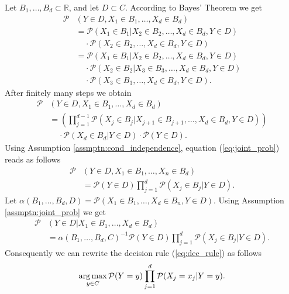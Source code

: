 Let $B_{1}, \ldots, B_{d}\subset\mathbb{R}$, and let $D\subset C$. According to Bayes' Theorem  we get
\begin{align*}
  \mathcal{P}&(Y\in D, X_{1}\in B_{1}, \ldots, X_{d}\in B_{d}) \\
		&= \mathcal{P}(X_{1}\in B_{1}|X_{2}\in B_{2}, \ldots, X_{d}\in B_{d}, Y\in D) \\ 
					& ~~~~~ \cdot	\mathcal{P}(X_{2}\in B_{2}, \ldots, X_{d}\in B_{d}, Y\in D) \\
		&= \mathcal{P}(X_{1}\in B_{1}|X_{2}\in B_{2}, \ldots, X_{d}\in B_{d}, Y\in D) \\
					& ~~~~~ \cdot \mathcal{P}(X_{2}\in B_{2}|X_{3}\in B_{3}, \ldots, X_{d}\in B_{d}, Y\in D) \\
					& ~~~~~ \cdot \mathcal{P}(X_{3}\in B_{3}, \ldots, X_{d}\in B_{d}, Y\in D).
\end{align*}
After finitely many steps we obtain
\begin{align}\label{eq:joint_prob}
  \mathcal{P}&(Y\in D, X_{1}\in B_{1}, \ldots, X_{d}\in B_{d}) \nonumber\\
		&=(\prod_{j = 1}^{d - 1}\mathcal{P}(X_{j}\in B_{j}|X_{j + 1}\in B_{j + 1}, \ldots, X_{d}\in B_{d}, Y\in D)) \nonumber\\
		& ~~~~~	\cdot\mathcal{P}(X_{d}\in B_{d}|Y\in D)\cdot\mathcal{P}(Y\in D).
\end{align}
Using Assumption \ref{assmptn:cond_independence}, equation (\ref{eq:joint_prob}) reads as follows
\begin{align*}
	\mathcal{P}&(Y\in D, X_{1}\in B_{1}, \ldots, X_{n}\in B_{d}) \\
		&= \mathcal{P}(Y\in D)\prod_{j = 1}^{d}\mathcal{P}(X_{j}\in B_{j}|Y\in D).
\end{align*}
Let $\alpha(B_{1}, \ldots, B_{d}, D)=\mathcal{P}(X_{1}\in B_{1}, \ldots, X_{d}\in B_{n}, Y\in D)$. Using Assumption \ref{assmptn:joint_prob} we get
	\begin{align*}
		\mathcal{P}&(Y\in D|X_{1}\in B_{1}, \ldots, X_{d}\in B_{d}) \\
			&= \alpha(B_{1}, \ldots, B_{d}, C)^{-1}\mathcal{P}(Y\in D)\prod_{j = 1}^{d}\mathcal{P}(X_{j}\in B_{j}|Y\in D).
	\end{align*}
Consequently we can rewrite the decision rule (\ref{eq:dec_rule}) as follows
\begin{align}\label{eq:dec_rule_updated_I}
	\operatorname*{arg\,max}_{y\in C} \mathcal{P}(Y = y) \prod_{j = 1}^{d}\mathcal{P}(X_{j}=x_{j} | Y = y).
\end{align}
  
